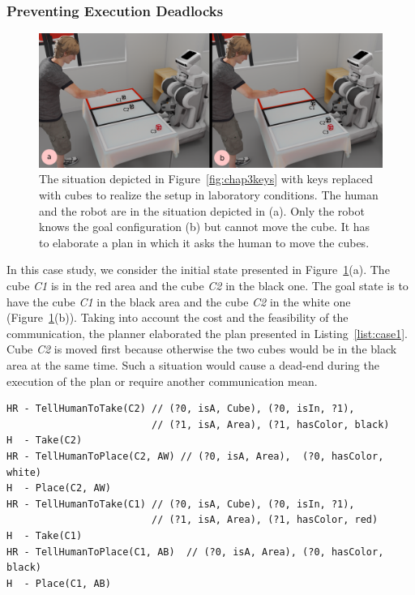 \documentclass[a4paper,11pt,twoside]{StyleThese}
\begin{document}
\subsubsection{Preventing Execution Deadlocks}
\begin{figure}[t!]
\centering
\includegraphics[width=\textwidth]{figures/chapter3/Chap3scen1.png}
\caption{\label{fig:chap3scen1}The situation depicted in Figure~\ref{fig:chap3keys} with keys replaced with cubes to realize the setup in laboratory conditions. The human and the robot are in the situation depicted in (a). Only the robot knows the goal configuration (b) but cannot move the cube. It has to elaborate a plan in which it asks the human to move the cubes.}
\end{figure}
In this case study, we consider the initial state presented in Figure~\ref{fig:chap3scen1}(a). The cube \textit{C1} is in the red area and the cube \textit{C2} in the black one. The goal state is to have the cube \textit{C1} in the black area and the cube \textit{C2} in the white one (Figure~\ref{fig:chap3scen1}(b)).
Taking into account the cost and the feasibility of the communication, the planner elaborated the plan presented in Listing~\ref{list:case1}. Cube \textit{C2} is moved first because otherwise the two cubes would be in the black area at the same time. Such a situation would cause a dead-end during the execution of the plan or require another communication mean.

\begin{lstlisting}[frame=single, basicstyle=\scriptsize\ttfamily, caption={The obtained plan for the first case study where cube C1 must be moved from the red to the black area and cube C2 moved from the black to the white area. The lines beginning with H represent the actions of the human and the lines beginning with HR represent actions involving the human and the robot (communication actions). In green are the REG results for each communication action.},captionpos=b, style=customPlan, label={list:case1}]
HR - TellHumanToTake(C2) // (?0, isA, Cube), (?0, isIn, ?1), 
                         // (?1, isA, Area), (?1, hasColor, black)
H  - Take(C2)
HR - TellHumanToPlace(C2, AW) // (?0, isA, Area),  (?0, hasColor, white)
H  - Place(C2, AW)
HR - TellHumanToTake(C1) // (?0, isA, Cube), (?0, isIn, ?1), 
                         // (?1, isA, Area), (?1, hasColor, red)
H  - Take(C1)
HR - TellHumanToPlace(C1, AB)  // (?0, isA, Area), (?0, hasColor, black)
H  - Place(C1, AB)
\end{lstlisting}
\end{document}
